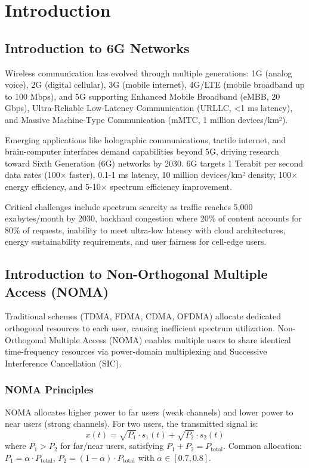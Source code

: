 \documentclass[12pt,a4paper]{article}
\begin{document}
\clearpage

\section{Introduction}

\subsection{Introduction to 6G Networks}

Wireless communication has evolved through multiple generations: 1G (analog voice), 2G (digital cellular), 3G (mobile internet), 4G/LTE (mobile broadband up to 100 Mbps), and 5G supporting Enhanced Mobile Broadband (eMBB, 20 Gbps), Ultra-Reliable Low-Latency Communication (URLLC, <1 ms latency), and Massive Machine-Type Communication (mMTC, 1 million devices/km²).

Emerging applications like holographic communications, tactile internet, and brain-computer interfaces demand capabilities beyond 5G, driving research toward Sixth Generation (6G) networks by 2030. 6G targets 1 Terabit per second data rates (100× faster), 0.1-1 ms latency, 10 million devices/km² density, 100× energy efficiency, and 5-10× spectrum efficiency improvement.

Critical challenges include spectrum scarcity as traffic reaches 5,000 exabytes/month by 2030, backhaul congestion where 20\% of content accounts for 80\% of requests, inability to meet ultra-low latency with cloud architectures, energy sustainability requirements, and user fairness for cell-edge users.

\subsection{Introduction to Non-Orthogonal Multiple Access (NOMA)}

Traditional schemes (TDMA, FDMA, CDMA, OFDMA) allocate dedicated orthogonal resources to each user, causing inefficient spectrum utilization. Non-Orthogonal Multiple Access (NOMA) enables multiple users to share identical time-frequency resources via power-domain multiplexing and Successive Interference Cancellation (SIC).

\subsubsection{NOMA Principles}

NOMA allocates higher power to far users (weak channels) and lower power to near users (strong channels). For two users, the transmitted signal is:
\begin{equation}
x(t) = \sqrt{P_1} \cdot s_1(t) + \sqrt{P_2} \cdot s_2(t)
\end{equation}
where $P_1 > P_2$ for far/near users, satisfying $P_1 + P_2 = P_{\text{total}}$. Common allocation: $P_1 = \alpha \cdot P_{\text{total}}$, $P_2 = (1-\alpha) \cdot P_{\text{total}}$ with $\alpha \in [0.7, 0.8]$.
\end{document}
